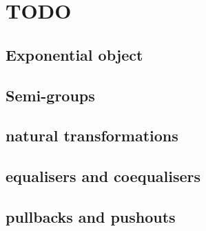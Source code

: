 \documentclass{article}
\theoremstyle{definition}
\begin{document}
\section{TODO}
\subsection{Exponential object}
\subsection{Semi-groups}
\subsection{natural transformations}
\subsection{equalisers and coequalisers}
\subsection{pullbacks and pushouts}
\end{document}
